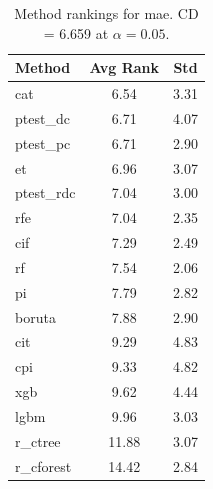 \begin{table}[h]
\centering
\caption{Method rankings for mae. CD = 6.659 at $\alpha=0.05$.}
\label{tab:ranks_mae}
\begin{tabular}{lcc}
\toprule
Method & Avg Rank & Std \\
\midrule
cat & 6.54 & 3.31 \\
ptest_dc & 6.71 & 4.07 \\
ptest_pc & 6.71 & 2.90 \\
et & 6.96 & 3.07 \\
ptest_rdc & 7.04 & 3.00 \\
rfe & 7.04 & 2.35 \\
cif & 7.29 & 2.49 \\
rf & 7.54 & 2.06 \\
pi & 7.79 & 2.82 \\
boruta & 7.88 & 2.90 \\
cit & 9.29 & 4.83 \\
cpi & 9.33 & 4.82 \\
xgb & 9.62 & 4.44 \\
lgbm & 9.96 & 3.03 \\
r_ctree & 11.88 & 3.07 \\
r_cforest & 14.42 & 2.84 \\
\bottomrule
\end{tabular}
\end{table}